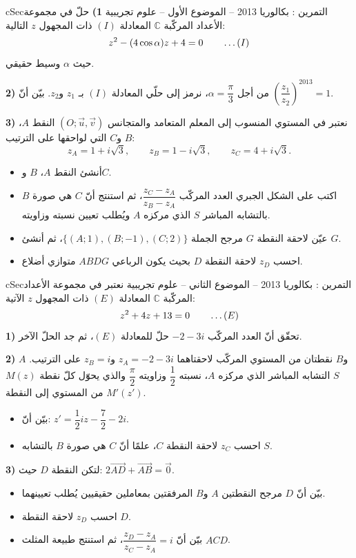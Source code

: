 \documentclass[12pt,a4paper]{article}
\newenvironment{BOX}[2]{\begin{otherlanguage}{english}\begin{arbox}{#1}{#2}}{\end{arbox}\end{otherlanguage}}
\newcounter{exo}
\newenvironment{tamrin}[1]{\stepcounter{exo}\begin{BOX}{cSec}{التمرين \theexo: #1}}{\end{BOX}}
\renewcommand{\ldots}{\mathinner{\ldotp\ldotp\ldotp}}
\newenvironment{sq}{\begin{itemize}[leftmargin=2.4em,itemsep=3pt]}{\end{itemize}}
\newcommand{\qa}{\item[(أ)]}\newcommand{\qb}{\item[(ب)]}\newcommand{\qc}{\item[(جـ)]}\newcommand{\qd}{\item[(د)]}\newcommand{\qe}{\item[(هـ)]}
\begin{document}
\begin{tamrin}{بكالوريا 2013 -- الموضوع الأول -- علوم تجريبية}
\textbf{1)} حلّ في مجموعة الأعداد المركّبة $\mathbb{C}$ المعادلة $(I)$ ذات المجهول $z$ التالية:
\[z^2-(4\cos\alpha)z+4=0\qquad\ldots(I)\]
حيث $\alpha$ وسيط حقيقي.

\textbf{2)} من أجل $\alpha=\dfrac{\pi}{3}$، نرمز إلى حلّي المعادلة $(I)$ بـ $z_1$ و$z_2$. بيّن أنّ $\left(\dfrac{z_1}{z_2}\right)^{2013}=1$.

\textbf{3)} نعتبر في المستوي المنسوب إلى المعلم المتعامد والمتجانس $(O;\vec u,\vec v)$ النقط $A$، $B$ و$C$ التي لواحقها على الترتيب:
\[z_A=1+i\sqrt3,\qquad z_B=1-i\sqrt3,\qquad z_C=4+i\sqrt3 .\]
\begin{sq}
\qa أنشئ النقط $A$، $B$ و$C$.
\qb اكتب على الشكل الجبري العدد المركّب $\dfrac{z_C-z_A}{z_B-z_A}$، ثم استنتج أنّ $C$ هي صورة $B$ بالتشابه المباشر $S$ الذي مركزه $A$ ويُطلب تعيين نسبته وزاويته.
\qc عيّن لاحقة النقطة $G$ مرجح الجملة $\{(A;1),(B;-1),(C;2)\}$، ثم أنشئ $G$.
\qd احسب $z_D$ لاحقة النقطة $D$ بحيث يكون الرباعي $ABDG$ متوازي أضلاع.
\end{sq}
\end{tamrin}

\begin{tamrin}{بكالوريا 2013 -- الموضوع الثاني -- علوم تجريبية}
نعتبر في مجموعة الأعداد المركّبة $\mathbb{C}$ المعادلة $(E)$ ذات المجهول $z$ الآتية:
\[z^2+4z+13=0\qquad\ldots(E)\]
\textbf{1)} تحقّق أنّ العدد المركّب $-2-3i$ حلّ للمعادلة $(E)$، ثم جد الحلّ الآخر.

\textbf{2)} $A$ و$B$ نقطتان من المستوي المركّب لاحقتاهما $z_A=-2-3i$ و$z_B=i$ على الترتيب.
$S$ التشابه المباشر الذي مركزه $A$، نسبته $\dfrac12$ وزاويته $\dfrac{\pi}{2}$ والذي يحوّل كلّ نقطة $M(z)$ من المستوي إلى النقطة $M'(z')$.
\begin{sq}
\qa بيّن أنّ: $z'=\dfrac12 iz-\dfrac72-2i$.
\qb احسب $z_C$ لاحقة النقطة $C$، علمًا أنّ $C$ هي صورة $B$ بالتشابه $S$.
\end{sq}
\textbf{3)} لتكن النقطة $D$ حيث: $2\overrightarrow{AD}+\overrightarrow{AB}=\vec 0$.
\begin{sq}
\qa بيّن أنّ $D$ مرجح النقطتين $A$ و$B$ المرفقتين بمعاملين حقيقيين يُطلب تعيينهما.
\qb احسب $z_D$ لاحقة النقطة $D$.
\qc بيّن أنّ $\dfrac{z_D-z_A}{z_C-z_A}=i$، ثم استنتج طبيعة المثلث $ACD$.
\end{sq}
\end{tamrin}
\end{document}
